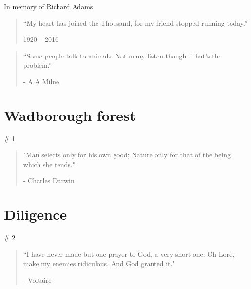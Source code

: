 \vspace*{4.3cm}
\begin{center}
	\begin{localsize}{10}
		In memory of Richard Adams\\
		\begin{quote}
			“My heart has joined the Thousand, for my friend stopped running today.”
			\begin{flushright}1920 -- 2016\end{flushright}
		\end{quote} 
	\end{localsize}
	\vspace{1cm}
	
\end{center}

\clearpage

\vspace*{4.3cm}
\begin{localsize}{10}
  \begin{quote}
    “Some people talk to animals. Not many listen though. That's the problem.”
    \begin{flushright}- A.A Milne \end{flushright}
  \end{quote} 
\end{localsize}
\vspace{1cm}


\chapter{Wadborough forest} # 1

\vspace{-1.3cm}
\begin{localsize}{10}
	\begin{quote}
		"Man selects only for his own good; Nature only for that of the being which she tends."
		\begin{flushright}- Charles Darwin\end{flushright}
	\end{quote} 
\end{localsize}


\chapter{Diligence} # 2

\vspace{-1.3cm}
\begin{localsize}{10}
	\begin{quote}
		“I have never made but one prayer to God, a very short one: Oh Lord, make my enemies ridiculous. And God granted it."
		\begin{flushright}- Voltaire \end{flushright}
	\end{quote}
\end{localsize}
\vspace{1cm}

